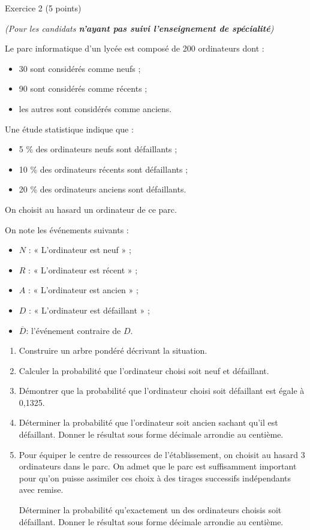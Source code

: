 
%
\begin{h2}Exercice 2 (5 points)\end{h2}
\textit{(Pour les candidats \textbf{n'ayant pas suivi l'enseignement de spécialité})}
\par
Le parc informatique d'un lycée est composé de 200 ordinateurs dont :
\begin{itemize}
     \item
     30 sont considérés comme neufs ;
     \item
     90 sont considérés comme récents ;
     \item
     les autres sont considérés comme anciens.
\end{itemize}
Une étude statistique indique que :
\begin{itemize}
     \item
     5 \% des ordinateurs neufs sont défaillants ;
     \item
     10 \% des ordinateurs récents sont défaillants ;
     \item
     20 \% des ordinateurs anciens sont défaillants.
\end{itemize}
On choisit au hasard un ordinateur de ce parc.
\par
On note les événements suivants :
\begin{itemize}
     \item
     $N$ : « L'ordinateur est neuf » ;
     \item
     $R$ : « L'ordinateur est récent » ;
     \item
     $A$ : « L'ordinateur est ancien » ;
     \item
     $D$ : « L'ordinateur est défaillant » ;
     \item
     $\overline{D} $: l'événement contraire de $D$.
\end{itemize}
\begin{enumerate}
     \item
     Construire un arbre pondéré décrivant la situation.
     \item
     Calculer la probabilité que l'ordinateur choisi soit neuf et défaillant.
     \item
     Démontrer que la probabilité que l'ordinateur choisi soit défaillant est égale à 0,1325.
     \item
     Déterminer la probabilité que l'ordinateur soit ancien sachant qu'il est défaillant. Donner le résultat sous forme décimale arrondie au centième.
     \item
     Pour équiper le centre de ressources de l'établissement, on choisit au hasard 3 ordinateurs dans le parc. On admet que le parc est suffisamment important pour qu'on puisse assimiler ces choix à des tirages successifs indépendants avec remise.
     \par
     Déterminer la probabilité qu'exactement un des ordinateurs choisis soit défaillant. Donner le résultat sous forme décimale arrondie au centième.
\end{enumerate}
